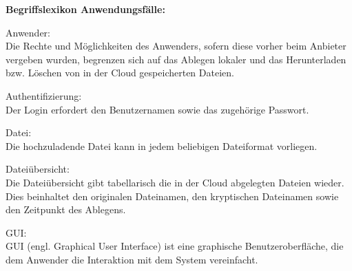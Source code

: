 \documentclass[12pt,a4paper,bibliography=totocnumbered,listof=totocnumbered]{scrartcl}
\begin{document}
\textbf{Begriffslexikon Anwendungsfälle:}
\begin{compactitem}
\item Anwender:\\
Die Rechte und Möglichkeiten des Anwenders, sofern diese vorher beim Anbieter vergeben wurden, begrenzen sich auf das Ablegen lokaler und das Herunterladen bzw. Löschen von in der Cloud gespeicherten Dateien.
\item Authentifizierung:\\
Der Login erfordert den Benutzernamen sowie das zugehörige Passwort.
\item Datei:\\
Die hochzuladende Datei kann in jedem beliebigen Dateiformat vorliegen.
\item Dateiübersicht:\\
Die Dateiübersicht gibt tabellarisch die in der Cloud abgelegten Dateien wieder. Dies beinhaltet den originalen Dateinamen, den kryptischen Dateinamen  sowie den Zeitpunkt des Ablegens.
\item GUI:\\
GUI (engl. Graphical User Interface) ist eine graphische Benutzeroberfläche, die dem Anwender die Interaktion mit dem System vereinfacht.
\end{compactitem}
\pagebreak
\end{document}
